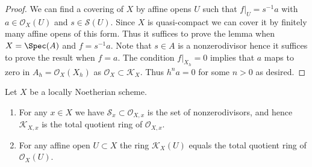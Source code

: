 \begin{proof}
We can find a covering of $X$ by affine opens $U$ such that $f|_U = s^{-1}a$
with $a \in \mathcal{O}_X(U)$ and $s \in \mathcal{S}(U)$. Since $X$ is
quasi-compact we can cover it by finitely many affine opens of this form.
Thus it suffices to prove the lemma when $X = \Spec(A)$ and $f = s^{-1}a$.
Note that $s \in A$ is a nonzerodivisor hence it suffices to prove
the result when $f = a$. The condition $f|_{X_h} = 0$ implies that
$a$ maps to zero in $A_h = \mathcal{O}_X(X_h)$ as
$\mathcal{O}_X \subset \mathcal{K}_X$. Thus $h^na = 0$ for some $n > 0$
as desired.
\end{proof}

\begin{lemma}
\label{lemma-locally-Noetherian-K}
Let $X$ be a locally Noetherian scheme.
\begin{enumerate}
\item For any $x \in X$ we have $\mathcal{S}_x \subset \mathcal{O}_{X, x}$
is the set of nonzerodivisors, and hence $\mathcal{K}_{X, x}$
is the total quotient ring of $\mathcal{O}_{X, x}$.
\item For any affine open $U \subset X$ the ring
$\mathcal{K}_X(U)$ equals the total quotient ring of $\mathcal{O}_X(U)$.
\end{enumerate}
\end{lemma}

